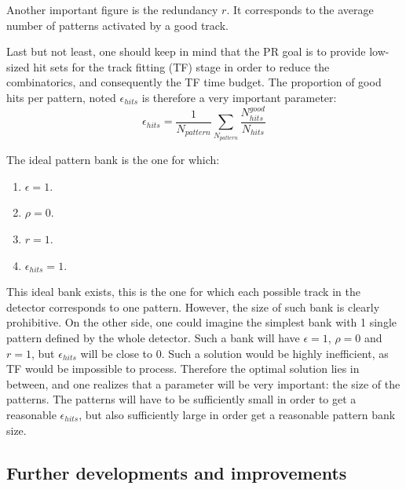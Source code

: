 \noindent Another important figure is the redundancy $r$. It corresponds to the average number of patterns activated by a good track. 

\noindent Last but not least, one should keep in mind that the PR goal is to provide low-sized hit sets for the track fitting (TF) stage in order to reduce the combinatorics, and consequently the TF time budget. The proportion of good hits per pattern, noted $\epsilon_{hits}$ is therefore a very important parameter:
\begin{equation}
\epsilon_{hits} = \frac{1}{N_{pattern}}\sum_{N_{pattern}}\frac{N_{hits}^{good}}{N_{hits}}
\end{equation} 

\noindent The ideal pattern bank is the one for which:  
\begin{enumerate}
\item $\epsilon = 1$.
\item $\rho = 0$.
\item $r = 1$.
\item $\epsilon_{hits} = 1$. 
\end{enumerate}  

\noindent This ideal bank exists, this is the one for which each possible track in the detector corresponds to one pattern. However, the size of such bank is clearly prohibitive. On the other side, one could imagine the simplest bank with 1 single pattern defined by the whole detector. Such a bank will have $\epsilon=1$, $\rho = 0$ and $r = 1$, but $\epsilon_{hits}$ will be close to 0. Such a solution would be highly inefficient, as TF would be impossible to process. Therefore the optimal solution lies in between, and one realizes that a parameter will be very important: the size of the patterns. The patterns will have to be sufficiently small in order to get a reasonable $\epsilon_{hits}$, but also sufficiently large in order get a reasonable pattern bank size. 


\subsection{Further developments and improvements}


\clearpage
